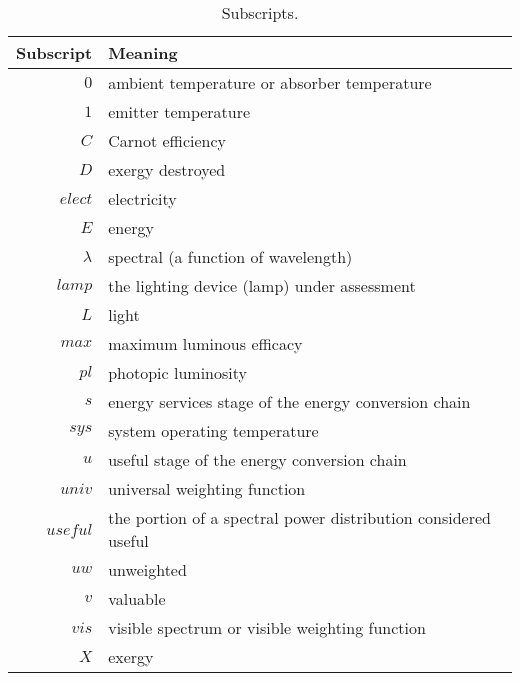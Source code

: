   


  
\begin{table}
\centering
\caption{Subscripts.}
\begin{tabular}{r l}
\toprule
Subscript & Meaning \\
\midrule
$0$ & ambient temperature or absorber temperature \\
$1$ & emitter temperature \\
$C$ & Carnot efficiency \\
$D$ & exergy destroyed \\
$elect$ & electricity \\
$E$ & energy \\
$\lambda$ & spectral (a function of wavelength) \\
$lamp$ & the lighting device (lamp) under assessment \\
$L$ & light \\
$max$ & maximum luminous efficacy \\
$pl$ & photopic luminosity \\
$s$ & energy services stage of the energy conversion chain \\
$sys$ & system operating temperature \\
$u$ & useful stage of the energy conversion chain \\
$univ$ & universal weighting function \\
$useful$ & the portion of a spectral power distribution considered useful \\
$uw$ & unweighted \\
$v$ & valuable \\
$vis$ & visible spectrum or visible weighting function \\
$X$ & exergy \\
\bottomrule
\end{tabular}
\label{tab:subscripts}
\end{table}


